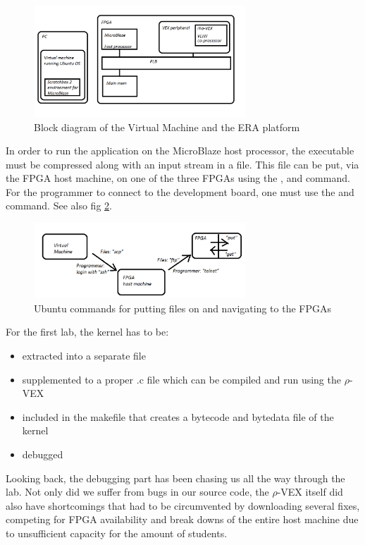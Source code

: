 \begin{figure}[htb]%
\centering
\includegraphics[width=300px]{Pictures/Platform_paint}%
\caption{Block diagram of the Virtual Machine and the ERA platform}%
\label{fig:lelijk}%
\end{figure}

In order to run the application on the MicroBlaze host processor, the  executable must be compressed along with an input stream in a  file. This file can be put, via the FPGA host machine, on one of the three FPGAs using the ,  and  command. For the programmer to connect to the development board, one must use the  and  command. See also fig \ref{fig:hoppen}.

\begin{figure}[htb]%
\centering
\includegraphics[width=300px]{Pictures/hop}%
\caption{Ubuntu commands for putting files on and navigating to the FPGAs}%
\label{fig:hoppen}%
\end{figure}

For the first lab, the  kernel has to be:
\begin{itemize}
	\item extracted into a separate file
	\item supplemented to a proper .c file which can be compiled and run using the $\rho$-VEX
	\item included in the makefile that creates a bytecode and bytedata file of the kernel
	\item debugged
\end{itemize}

Looking back, the debugging part has been chasing us all the way through the lab. Not only did we suffer from bugs in our source code, the $\rho$-VEX itself did also have shortcomings that had to be circumvented by downloading several fixes, competing for FPGA availability and break downs of the entire host machine due to unsufficient capacity for the amount of students.

